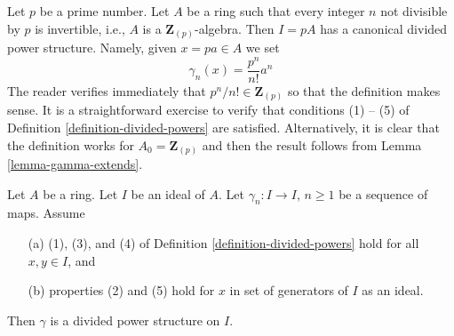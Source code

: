 \begin{example}
\label{example-ideal-generated-by-p}
Let $p$ be a prime number.
Let $A$ be a ring such that every integer $n$ not divisible by $p$
is invertible, i.e., $A$ is a $\mathbf{Z}_{(p)}$-algebra. Then
$I = pA$ has a canonical divided power structure. Namely, given
$x = pa \in A$ we set
$$
\gamma_n(x) = \frac{p^n}{n!} a^n
$$
The reader verifies immediately that $p^n/n! \in \mathbf{Z}_{(p)}$
so that the definition makes sense. It is a straightforward exercise to
verify that conditions (1) -- (5) of
Definition \ref{definition-divided-powers} are satisfied.
Alternatively, it is clear that the definition works for
$A_0 = \mathbf{Z}_{(p)}$ and then the result follows from
Lemma \ref{lemma-gamma-extends}.
\end{example}

\begin{lemma}
\label{lemma-check-on-generators}
Let $A$ be a ring. Let $I$ be an ideal of $A$. Let $\gamma_n : I \to I$,
$n \geq 1$ be a sequence of maps. Assume
\begin{enumerate}
\item[(a)] (1), (3), and (4) of Definition \ref{definition-divided-powers}
hold for all $x, y \in I$, and
\item[(b)] properties (2) and (5) hold for $x$ in
set of generators of $I$ as an ideal.
\end{enumerate}
Then $\gamma$ is a divided power structure on $I$.
\end{lemma}

